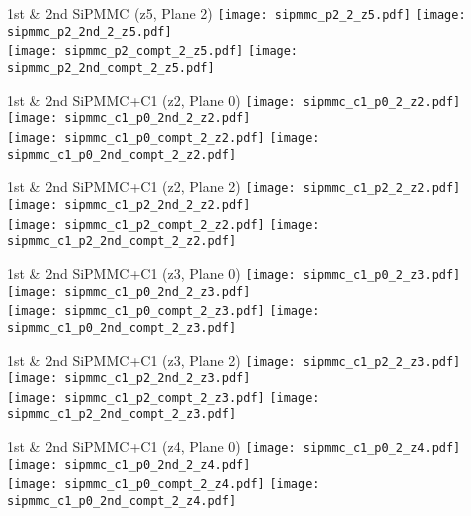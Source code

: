 \documentclass{beamer}
\begin{document}
\begin{frame}{1st \& 2nd SiPMMC (z5, Plane 2)}
	\texttt{[image: sipmmc\_p2\_2\_z5.pdf]}
	\texttt{[image: sipmmc\_p2\_2nd\_2\_z5.pdf]} \\
	
		\texttt{[image: sipmmc\_p2\_compt\_2\_z5.pdf]}
		\texttt{[image: sipmmc\_p2\_2nd\_compt\_2\_z5.pdf]}
\end{frame}

\begin{frame}{1st \& 2nd SiPMMC+C1 (z2, Plane 0)}
	\texttt{[image: sipmmc\_c1\_p0\_2\_z2.pdf]}
	\texttt{[image: sipmmc\_c1\_p0\_2nd\_2\_z2.pdf]} \\
	
		\texttt{[image: sipmmc\_c1\_p0\_compt\_2\_z2.pdf]}
		\texttt{[image: sipmmc\_c1\_p0\_2nd\_compt\_2\_z2.pdf]} 
\end{frame}

\begin{frame}{1st \& 2nd SiPMMC+C1 (z2, Plane 2)}
	\texttt{[image: sipmmc\_c1\_p2\_2\_z2.pdf]}
	\texttt{[image: sipmmc\_c1\_p2\_2nd\_2\_z2.pdf]} \\
	
		\texttt{[image: sipmmc\_c1\_p2\_compt\_2\_z2.pdf]}
		\texttt{[image: sipmmc\_c1\_p2\_2nd\_compt\_2\_z2.pdf]}
\end{frame}

\begin{frame}{1st \& 2nd SiPMMC+C1 (z3, Plane 0)}
	\texttt{[image: sipmmc\_c1\_p0\_2\_z3.pdf]}
	\texttt{[image: sipmmc\_c1\_p0\_2nd\_2\_z3.pdf]} \\
	
		\texttt{[image: sipmmc\_c1\_p0\_compt\_2\_z3.pdf]}
		\texttt{[image: sipmmc\_c1\_p0\_2nd\_compt\_2\_z3.pdf]}
\end{frame}

\begin{frame}{1st \& 2nd SiPMMC+C1 (z3, Plane 2)}
	\texttt{[image: sipmmc\_c1\_p2\_2\_z3.pdf]}
	\texttt{[image: sipmmc\_c1\_p2\_2nd\_2\_z3.pdf]} \\
	
		\texttt{[image: sipmmc\_c1\_p2\_compt\_2\_z3.pdf]}
		\texttt{[image: sipmmc\_c1\_p2\_2nd\_compt\_2\_z3.pdf]}
\end{frame}

\begin{frame}{1st \& 2nd SiPMMC+C1 (z4, Plane 0)}
	\texttt{[image: sipmmc\_c1\_p0\_2\_z4.pdf]}
	\texttt{[image: sipmmc\_c1\_p0\_2nd\_2\_z4.pdf]} \\
	
		\texttt{[image: sipmmc\_c1\_p0\_compt\_2\_z4.pdf]}
		\texttt{[image: sipmmc\_c1\_p0\_2nd\_compt\_2\_z4.pdf]}
\end{frame}
\end{document}
